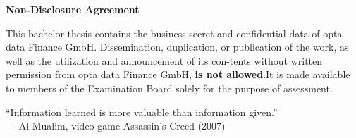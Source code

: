 \thispagestyle{empty} %

\begin{center}
    \Large\textbf{Non-Disclosure Agreement}
\end{center}

\noindent %
This bachelor thesis contains the business secret and confidential data  of opta data Finance GmbH. Dissemination, duplication, or publication of the work, as well as the utilization and announcement of its con-tents without written permission from opta data Finance GmbH, \textbf{is not allowed}.It is made available to members of the Examination Board solely for the purpose of assessment.\\

                   \begin{center}
              \color{teal}
                        \large{“Information learned is more valuable than information given.”}\\
                      \color{black} 
                                                 {— Al Mualim, video game Assassin’s Creed (2007)}  
                   \end{center}